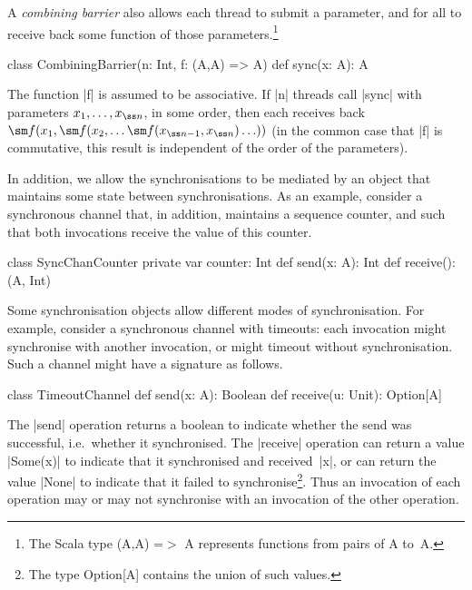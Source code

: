 A \emph{combining barrier} also allows each thread to submit a parameter, and
for all to receive back some function of those parameters.\footnote{The Scala
  type {\scalastyle (A,A) =}$>$ {\scalastyle A} represents functions from
  pairs of {\scalastyle A} to~{\scalastyle A}.}
%
\begin{scala}
class CombiningBarrier(n: Int, f: (A,A) => A){
  def sync(x: A): A
}
\end{scala}
%
The function |f| is assumed to be associative.  If |n| threads call |sync|
with parameters $x_1, \ldots, x_{\ss n}$, in some order, then each receives
back $\sm f(x_1, \sm f(x_2, \ldots \sm f(x_{{\ss n}-1}, x_{\ss n}) \ldots ))$
(in the common case that |f| is commutative, this result is independent of the
order of the parameters).

In addition, we allow the synchronisations to be mediated by an object that
maintains some state between synchronisations.  As an example, consider a
synchronous channel that, in addition, maintains a sequence counter, and such
that both invocations receive the value of this counter.
\begin{scala}
class SyncChanCounter{
  private var counter: Int
  def send(x: A): Int
  def receive(): (A, Int)
}
\end{scala}



Some synchronisation objects allow different modes of synchronisation.  For
example, consider a synchronous channel with timeouts: each invocation might
synchronise with another invocation, or might timeout without
synchronisation.  Such a channel might have a signature as follows.
%
\begin{scala}
class TimeoutChannel{
  def send(x: A): Boolean
  def receive(u: Unit): Option[A]
}
\end{scala}
%
The |send| operation returns a boolean to indicate whether the send was
successful, i.e.~whether it synchronised.  The |receive| operation can return
a value |Some(x)| to indicate that it synchronised and received~|x|, or can
return the value |None| to indicate that it failed to synchronise\footnote{The
  type {\scalashape Option[A]} contains the union of such values.}.  Thus an
invocation of each operation may or may not synchronise with an invocation of
the other operation. 

